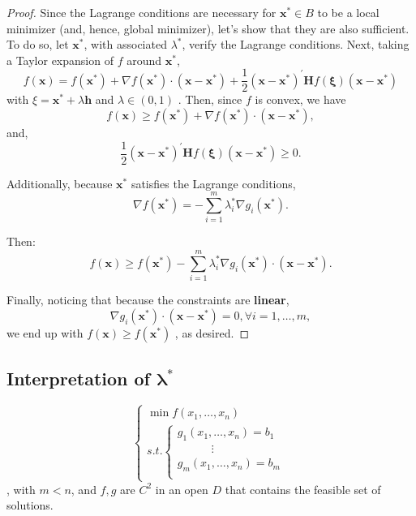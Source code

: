 \begin{proof}
    Since the Lagrange conditions are necessary for \(\mathbf{x}^{*} \in B\)
    to be a local minimizer (and, hence, global minimizer), let's show that
    they are also sufficient. To do so, let \(\mathbf{x}^{*}\), with
    associated \(\lambda^{*}\), verify the Lagrange conditions. Next,
    taking a Taylor expansion of \(f\) around \(\mathbf{x}^{*}\),
    \[
        f(\mathbf{x}) = f(\mathbf{x}^{*}) + \nabla f(\mathbf{x}^{*})\cdot (\mathbf{x} - \mathbf{x}^{*}) + \frac{1}{2} (\mathbf{x} - \mathbf{x}^{*})^{\prime}\mathbf{H}f(\pmb {\xi})(\mathbf{x} - \mathbf{x}^{*})
    \]
    with \(\xi = \mathbf{x}^{*} + \lambda \mathbf{h}\) and
    \(\lambda \in (0,1)\) . Then, since \(f\) is convex, we have
    \[
        f(\mathbf{x})\geq f(\mathbf{x}^{*}) + \nabla f(\mathbf{x}^{*})\cdot (\mathbf{x} - \mathbf{x}^{*}),
    \]
    and,
    \[
        \frac{1}{2} (\mathbf{x} - \mathbf{x}^{*})^{\prime}\mathbf{H}f(\pmb {\xi})(\mathbf{x} - \mathbf{x}^{*})\geq 0.
    \]

    Additionally, because \(\mathbf{x}^{*}\) satisfies the Lagrange
    conditions,
    \[
        \nabla f(\mathbf{x}^{*}) = -\sum_{i = 1}^{m}\lambda_{i}^{*}\nabla g_{i}(\mathbf{x}^{*}).
    \]

    Then:
    \[
        f(\mathbf{x})\geq f(\mathbf{x}^{*}) - \sum_{i = 1}^{m}\lambda_{i}^{*}\nabla g_{i}(\mathbf{x}^{*})\cdot (\mathbf{x} - \mathbf{x}^{*}).
    \]

    Finally, noticing that because the constraints are \textbf{linear},
    \[
        \nabla g_{i}(\mathbf{x}^{*})\cdot (\mathbf{x} - \mathbf{x}^{*}) = 0,\forall i = 1,\dots,m,
    \]
    we end up with \(f(\mathbf{x})\geq f(\mathbf{x}^{*})\) , as desired.
\end{proof}

\subsection{Interpretation of $\boldsymbol{\lambda ^{*}}$}
\[
    \left\{\begin{array}{l}
        \min f(x_1, \dots, x_n) \\
        s.t. \left\{\begin{array}{l}
                        g_1(x_1, \dots, x_n) = b_1 \\
                        \qquad \quad \vdots        \\
                        g_m(x_1, \dots, x_n) = b_m \\
                    \end{array}\right.
    \end{array}\right.
\]
, with $m < n$, and $f, g$ are $C ^{2}$ in an open $D$ that contains the feasible set of solutions.

